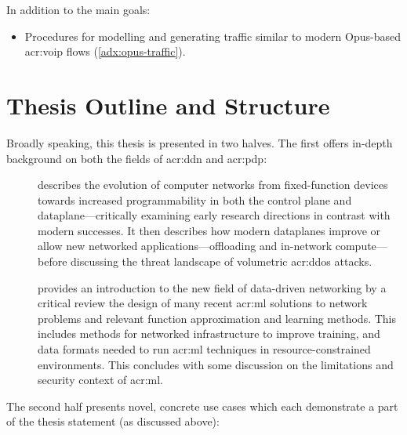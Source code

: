In addition to the main goals:
\begin{itemize}
	\item Procedures for modelling and generating traffic similar to modern Opus-based \gls{acr:voip} flows (\cref{adx:opus-traffic}).
\end{itemize}

\section{Thesis Outline and Structure}
Broadly speaking, this thesis is presented in two halves.
The first offers in-depth background on both the fields of \gls{acr:ddn} and \gls{acr:pdp}:
\begin{description}
	\item[] describes the evolution of computer networks from fixed-function devices towards increased programmability in both the control plane and dataplane---critically examining early research directions in contrast with modern successes. It then describes how modern dataplanes improve or allow new networked applications---offloading and in-network compute---before discussing the threat landscape of volumetric \gls{acr:ddos} attacks.
	\item[] provides an introduction to the new field of data-driven networking by a critical review the design of many recent \gls{acr:ml} solutions to network problems and relevant function approximation and learning methods. This includes methods for networked infrastructure to improve training, and data formats needed to run \gls{acr:ml} techniques in resource-constrained environments. This concludes with some discussion on the limitations and security context of \gls{acr:ml}.
\end{description}
The second half presents novel, concrete use cases which each demonstrate a part of the thesis statement (as discussed above):
